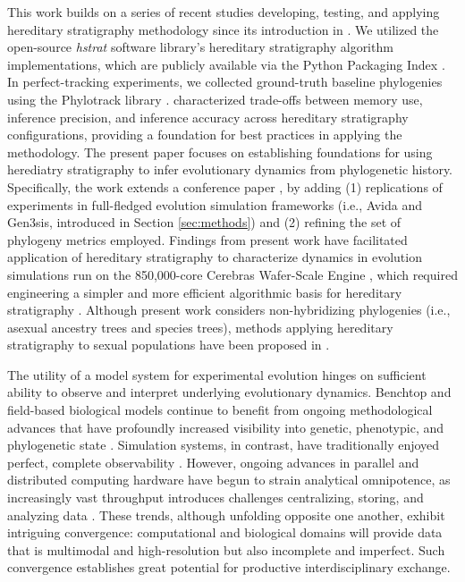 This work builds on a series of recent studies developing, testing, and applying hereditary stratigraphy methodology since its introduction in \citet{moreno2022hereditary}.
We utilized the open-source \textit{hstrat} software library's hereditary stratigraphy algorithm implementations, which are publicly available via the Python Packaging Index \citep{moreno2022hstrat}.
In perfect-tracking experiments, we collected ground-truth baseline phylogenies using the Phylotrack library \citep{dolson2024phylotrack}. 
\citet{moreno2024guide} characterized trade-offs between memory use, inference precision, and inference accuracy across hereditary stratigraphy configurations, providing a foundation for best practices in applying the methodology.
The present paper focuses on establishing foundations for using herediatry stratigraphy to infer evolutionary dynamics from phylogenetic history.
Specifically, the work extends a conference paper \citet{moreno2023toward}, by adding (1) replications of experiments in full-fledged evolution simulation frameworks (i.e., Avida and Gen3sis, introduced in Section \ref{sec:methods}) and (2) refining the set of phylogeny metrics employed.
Findings from present work have facilitated application of hereditary stratigraphy to characterize dynamics in evolution simulations run on the 850,000-core Cerebras Wafer-Scale Engine \citep{moreno2024trackable}, which required engineering a simpler and more efficient algorithmic basis for hereditary stratigraphy \citep{moreno2024structured}.
Although present work considers non-hybridizing phylogenies (i.e., asexual ancestry trees and species trees), methods applying hereditary stratigraphy to sexual populations have been proposed in \citet{moreno2024methods}.

The utility of a model system for experimental evolution hinges on sufficient ability to observe and interpret underlying evolutionary dynamics.
Benchtop and field-based biological models continue to benefit from ongoing methodological advances that have profoundly increased visibility into genetic, phenotypic, and phylogenetic state \citep{woodworth2017building,blomberg2011measuring,schneider2019past}.
Simulation systems, in contrast, have traditionally enjoyed perfect, complete observability \citep{hindre2012new}.
However, ongoing advances in parallel and distributed computing hardware have begun to strain analytical omnipotence, as increasingly vast throughput introduces challenges centralizing, storing, and analyzing data \citep{klasky2021data}.
These trends, although unfolding opposite one another, exhibit intriguing convergence: computational and biological domains will provide data that is multimodal and high-resolution but also incomplete and imperfect.
Such convergence establishes great potential for productive interdisciplinary exchange.


